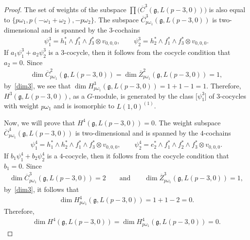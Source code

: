 \documentclass[10pt,a4paper]{amsart}
\numberwithin{equation}{section}
\begin{document}
\begin{proof}
The set of weights of the subspace $\prod\big(\overline{C}^3(\mathfrak{g},L(p-3,0))\big)$ is also equal to $\{p\omega_1,p(-\omega_1+\omega_2),\allowbreak -p\omega_2\}$. The subspace
$\overline{C}^3_{p\omega_1}(\mathfrak{g},L(p-3,0))$ is two-dimensional and is spanned by the $3$-cochains
\begin{gather*}
\psi^3_1=h_1^*\wedge f_1^*\wedge f_3^*\otimes v_{0,0,0},\qquad\psi^3_2=h_2^*\wedge f_1^*\wedge f_3^*\otimes v_{0,0,0}.
\end{gather*}
If $a_1\psi^3_1+a_2\psi^3_2$ is a $3$-cocycle, then it follows from the cocycle condition that $a_2=0$. Since
\begin{gather*}
\dim \overline{C}^2_{p\omega_1}(\mathfrak{g},L(p-3,0))=\dim \overline{Z}^2_{p\omega_1}(\mathfrak{g},L(p-3,0))=1,
\end{gather*}
by~\eqref{dim3}, we see that $\dim H^3_{p\omega_1}(\mathfrak{g},L(p-3,0))=1+1-1=1$. Therefore, $H^3(\mathfrak{g},L(p-3,0))$, as a $G$-module, is generated by the class $\big[\psi^3_1\big]$ of $3$-cocycles with weight $p\omega_1$ and is isomorphic to $L(1,0)^{(1)}$.

 Now, we will prove that $H^4(\mathfrak{g},L(p-3,0))=0$. The weight subspace
$\overline{C}^4_{p\omega_1}(\mathfrak{g},L(p-3,0))$ is two-dimensional and is spanned by the $4$-cochains
\begin{gather*}
\psi^4_1=h_1^*\wedge h_2^*\wedge f_1^*\wedge f_3^*\otimes v_{0,0,0},\qquad\psi^4_2=e_2^*\wedge f_1^*\wedge f_2^*\wedge f_3^*\otimes v_{0,0,0}.
\end{gather*}
If $b_1\psi^4_1+b_2\psi^4_2$
is a $4$-cocycle, then it follows from the cocycle condition that $b_1=0$. Since
\begin{gather*}
\dim \overline{C}^3_{p\omega_1}(\mathfrak{g},L(p-3,0))=2\qquad\text{and}\qquad
\dim \overline{Z}^3_{p\omega_1}(\mathfrak{g},L(p-3,0))=1,
\end{gather*}
by~\eqref{dim3}, it follows that
\begin{gather*}
\dim H^4_{p\omega_1}(\mathfrak{g},L(p-3,0))=1+1-2=0.
\end{gather*}
Therefore,
\begin{gather*}
\dim H^4(\mathfrak{g},L(p-3,0))=\dim H^4_{p\omega_1}(\mathfrak{g},L(p-3,0))=0.
\end{gather*}


\end{proof}
\end{document}
